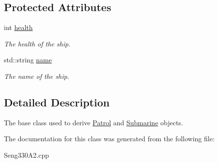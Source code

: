 \subsection*{Protected Attributes}
\begin{DoxyCompactItemize}
\item 
\hypertarget{class_ship_a110781c5f23a8c9a9cfc010601ea32b8}{}int \hyperlink{class_ship_a110781c5f23a8c9a9cfc010601ea32b8}{health}\label{class_ship_a110781c5f23a8c9a9cfc010601ea32b8}

\begin{DoxyCompactList}\small\item\em The health of the ship. \end{DoxyCompactList}\item 
\hypertarget{class_ship_a2e1ec44d8edcfc20d8d580f95fd6af75}{}std\+::string \hyperlink{class_ship_a2e1ec44d8edcfc20d8d580f95fd6af75}{name}\label{class_ship_a2e1ec44d8edcfc20d8d580f95fd6af75}

\begin{DoxyCompactList}\small\item\em The name of the ship. \end{DoxyCompactList}\end{DoxyCompactItemize}


\subsection{Detailed Description}
The base class used to derive \hyperlink{class_patrol}{Patrol} and \hyperlink{class_submarine}{Submarine} objects. 

The documentation for this class was generated from the following file\+:\begin{DoxyCompactItemize}
\item 
Seng330\+A2.\+cpp\end{DoxyCompactItemize}
